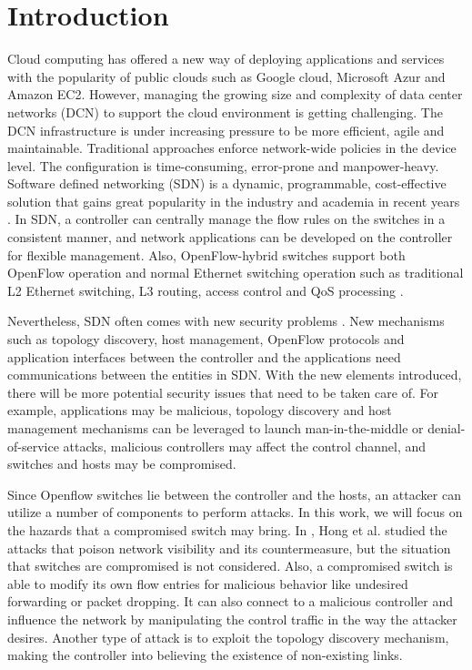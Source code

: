 \chapter{Introduction}
\label{chap:intro}
\setcounter{page}{1}

Cloud computing has offered a new way of deploying applications and services with the popularity of public clouds such as Google cloud, Microsoft Azur and Amazon EC2. However, managing the growing size and complexity of data center networks (DCN) to support the cloud environment is getting challenging. The DCN infrastructure is under increasing pressure to be more efficient, agile and maintainable. Traditional approaches enforce network-wide policies in the device level. The configuration is time-consuming, error-prone and manpower-heavy. Software defined networking (SDN) is a dynamic, programmable, cost-effective solution that gains great popularity in the industry and academia in recent years \cite{KRVRAU15, MABPPRST08, LHM10}. In SDN, a controller can centrally manage the flow rules on the switches in a consistent manner, and network applications can be developed on the controller for flexible management. Also, OpenFlow-hybrid switches support both OpenFlow operation and normal Ethernet switching operation such as traditional L2 Ethernet switching, L3 routing, access control and QoS processing \cite{OF_SPEC}.

Nevertheless, SDN often comes with new security problems \cite{SOS13,CM}. New mechanisms such as topology discovery, host management, OpenFlow protocols and application interfaces between the controller and the applications need communications between the entities in SDN. With the new elements introduced, there will be more potential security issues that need to be taken care of. For example, applications may be malicious, topology discovery and host management mechanisms can be leveraged to launch man-in-the-middle or denial-of-service attacks, malicious controllers may affect the control channel, and switches and hosts may be compromised.

Since Openflow switches lie between the controller and the hosts, an attacker can utilize a number of components to perform attacks. In this work, we will focus on the hazards that a compromised switch may bring. In \cite{HXWG15}, Hong et al. studied the attacks that poison network visibility and its countermeasure, but the situation that switches are compromised is not considered. Also, a compromised switch is able to modify its own flow entries for malicious behavior like undesired forwarding or packet dropping. It can also connect to a malicious controller and influence the network by manipulating the control traffic in the way the attacker desires\sout{}. Another type of attack is to exploit the topology discovery mechanism, making the controller into believing the existence of non-existing links.


